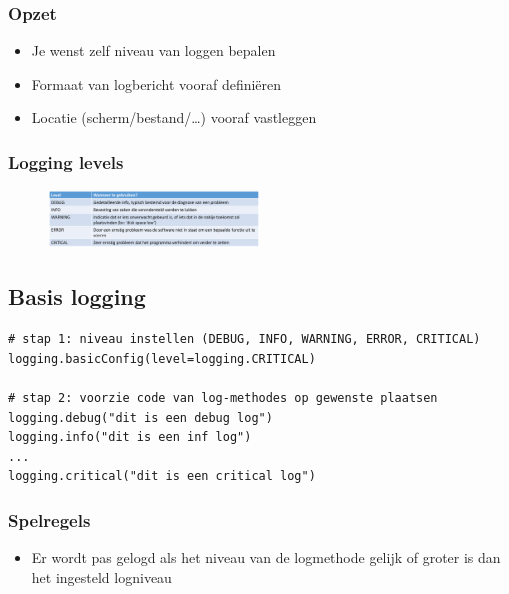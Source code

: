 \documentclass{article}
\begin{document}
\subsubsection{Opzet}

\begin{itemize}
    \item Je wenst zelf niveau van loggen bepalen
    \item Formaat van logbericht vooraf definiëren
    \item Locatie (scherm/bestand/\dots) vooraf vastleggen
\end{itemize}

\subsubsection{Logging levels}

\begin{figure}[H]
    \centering
    \includegraphics[width=0.5\textwidth]{logging-levels.png}
\end{figure}

\subsection{Basis logging}

\begin{verbatim}
# stap 1: niveau instellen (DEBUG, INFO, WARNING, ERROR, CRITICAL)
logging.basicConfig(level=logging.CRITICAL)

# stap 2: voorzie code van log-methodes op gewenste plaatsen
logging.debug("dit is een debug log")
logging.info("dit is een inf log")
...
logging.critical("dit is een critical log")
\end{verbatim}

\subsubsection{Spelregels}

\begin{itemize}
    \item Er wordt pas gelogd als het niveau van de logmethode gelijk of groter is dan het ingesteld logniveau
\end{itemize}
\end{document}
